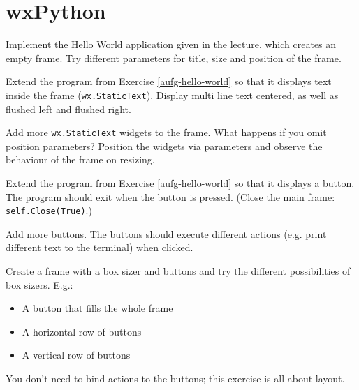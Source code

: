\section*{wxPython}

\begin{aufgabe}
\label{aufg-hello-world}Implement the Hello World application given in the lecture, which creates an empty frame. Try different parameters for title, size and position of the frame.
\end{aufgabe}

\begin{aufgabe}
\begin{teilaufgabe}
Extend the program from Exercise \ref{aufg-hello-world} so that it displays text inside the frame (\lstinline{wx.StaticText}). Display multi line text centered, as well as flushed left and flushed right.
\end{teilaufgabe}
\begin{teilaufgabe}
Add more \lstinline{wx.StaticText} widgets to the frame. What happens if you omit position parameters? Position the widgets via parameters and observe the behaviour of the frame on resizing.
\end{teilaufgabe}
\end{aufgabe}


\begin{aufgabe}[Buttons]
\begin{teilaufgabe}
Extend the program from Exercise \ref{aufg-hello-world} so that it displays a button. The program should exit when the button is pressed. (Close the main frame: \lstinline{self.Close(True)}.)
\end{teilaufgabe}
\begin{teilaufgabe}
Add more buttons. The buttons should execute different actions (e.g. print different text to the terminal) when clicked.
\end{teilaufgabe}
\end{aufgabe}

\begin{aufgabe}[Sizer]
\label{aufg-sizer}
Create a frame with a box sizer and buttons and try the different possibilities of box sizers. E.g.:
\begin{itemize}
\item A button that fills the whole frame
\item A horizontal row of buttons
\item A vertical row of buttons
\end{itemize}
You don't need to bind actions to the buttons; this exercise is all about layout.
\end{aufgabe}


